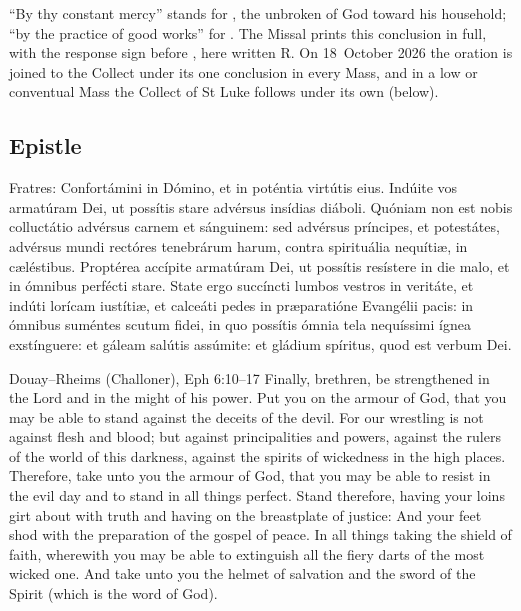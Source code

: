 \noindent ``By thy constant mercy'' stands for , the
unbroken  of God toward his household; ``by the practice of good
works'' for . The Missal prints this conclusion in full,
with the response sign before , here written R. On 18~October 2026
the oration  is joined to the Collect under its
one conclusion in every Mass, and in a low or conventual Mass the Collect of St
Luke follows under its own (below).

\subsection{Epistle}
\label{proper-epistle}


\begin{latinproper}
Fratres: Confortámini in Dómino, et in poténtia virtútis eius. Indúite vos
armatúram Dei, ut possítis stare advérsus insídias diáboli. Quóniam non est
nobis colluctátio advérsus carnem et sánguinem: sed advérsus príncipes, et
potestátes, advérsus mundi rectóres tenebrárum harum, contra spirituália
nequítiæ, in cæléstibus. Proptérea accípite armatúram Dei, ut possítis
resístere in die malo, et in ómnibus perfécti stare. State ergo succíncti lumbos
vestros in veritáte, et indúti lorícam iustítiæ, et calceáti pedes in
præparatióne Evangélii pacis: in ómnibus suméntes scutum fidei, in quo possítis
ómnia tela nequíssimi ígnea exstínguere: et gáleam salútis assúmite: et gládium
spíritus, quod est verbum Dei.
\end{latinproper}

\begin{englishwitness}{Douay--Rheims (Challoner), Eph 6:10--17}
Finally, brethren, be strengthened in the Lord and in the might of his power.
Put you on the armour of God, that you may be able to stand against the deceits
of the devil. For our wrestling is not against flesh and blood; but against
principalities and powers, against the rulers of the world of this darkness,
against the spirits of wickedness in the high places. Therefore, take unto you
the armour of God, that you may be able to resist in the evil day and to stand
in all things perfect. Stand therefore, having your loins girt about with truth
and having on the breastplate of justice: And your feet shod with the
preparation of the gospel of peace. In all things taking the shield of faith,
wherewith you may be able to extinguish all the fiery darts of the most wicked
one. And take unto you the helmet of salvation and the sword of the Spirit
(which is the word of God).
\end{englishwitness}

